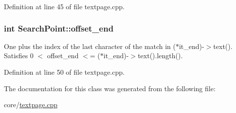 Definition at line 45 of file textpage.\+cpp.

\hypertarget{classSearchPoint_ad727c2d1a0467af554fd1fe38d2c757c}{
\subsubsection[{offset\+\_\+end}]{\setlength{\rightskip}{0pt plus 5cm}int Search\+Point\+::offset\+\_\+end}}\label{classSearchPoint_ad727c2d1a0467af554fd1fe38d2c757c}
One plus the index of the last character of the match in ($\ast$it\+\_\+end)-\/$>$text(). Satisfies 0 $<$ offset\+\_\+end $<$= ($\ast$it\+\_\+end)-\/$>$text().length(). 

Definition at line 50 of file textpage.\+cpp.



The documentation for this class was generated from the following file\+:\begin{DoxyCompactItemize}
\item 
core/\hyperlink{textpage_8cpp}{textpage.\+cpp}\end{DoxyCompactItemize}
